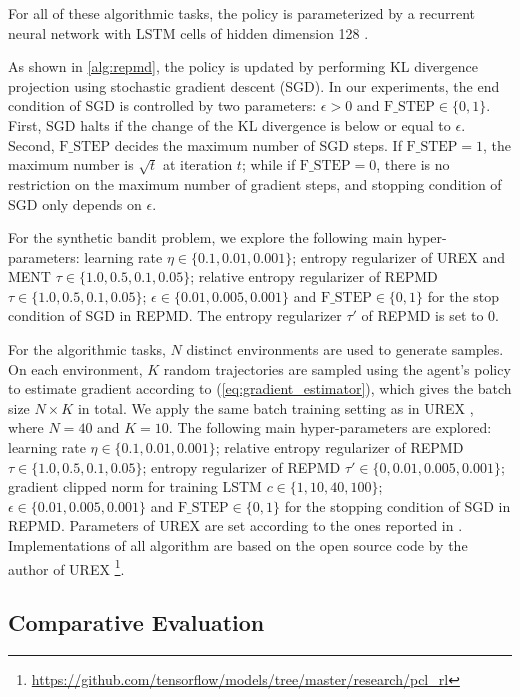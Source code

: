 For all of these algorithmic tasks, the policy is parameterized by a recurrent neural network with LSTM cells of hidden dimension 128 \citep{hochreiter1997long}. 

As shown in \cref{alg:repmd}, the policy is updated by performing KL divergence projection using stochastic gradient descent (SGD). In our experiments, the end condition of SGD is controlled by two parameters: $\epsilon > 0$ and $\text{F\_STEP}\in \{0,1 \}$. First, SGD halts if the change of the KL divergence is below or equal to $\epsilon$. Second, $\text{F\_STEP}$ decides the maximum number of SGD steps. If $\text{F\_STEP}=1$, the maximum number is $\sqrt{t}$ at iteration $t$; while if $\text{F\_STEP}=0$, there is no restriction on the maximum number of gradient steps, and stopping condition of SGD only depends on $\epsilon$.

For the synthetic bandit problem, we explore the following main hyper-parameters: learning rate $\eta \in \{0.1, 0.01, 0.001\}$; entropy regularizer of UREX and MENT $\tau\in \{1.0, 0.5, 0.1, 0.05\}$; relative entropy regularizer of REPMD $\tau\in \{1.0, 0.5, 0.1, 0.05\}$; $\epsilon\in \{0.01, 0.005, 0.001\}$ and $\text{F\_STEP}\in \{0,1\}$ for the stop condition of SGD in REPMD. The entropy regularizer $\tau'$ of REPMD is set to 0.  

For the algorithmic tasks, $N$ distinct environments are used to generate samples. On each environment, $K$ random trajectories are sampled using the agent's policy to estimate gradient according to (\ref{eq:gradient_estimator}), which gives the batch size $N\times K$ in total. We apply the same batch training setting as in UREX \citep{nachum2017improving}, where $N=40$ and $K=10$. The following main hyper-parameters are explored: learning rate $\eta \in \{0.1, 0.01, 0.001\}$; relative entropy regularizer of REPMD $\tau\in \{1.0, 0.5, 0.1, 0.05\}$; entropy regularizer of REPMD $\tau'\in \{0, 0.01, 0.005, 0.001\}$; gradient clipped norm for training LSTM $c\in \{1, 10, 40, 100\}$; $\epsilon\in \{0.01, 0.005, 0.001\}$ and $\text{F\_STEP}\in \{0,1\}$ for the stopping condition of SGD in REPMD. Parameters of UREX are set according to the ones reported in \citet{nachum2017improving}. Implementations of all algorithm are based on the open source code by the author of UREX \footnote{\url{https://github.com/tensorflow/models/tree/master/research/pcl_rl}}.

\subsection{Comparative Evaluation}

